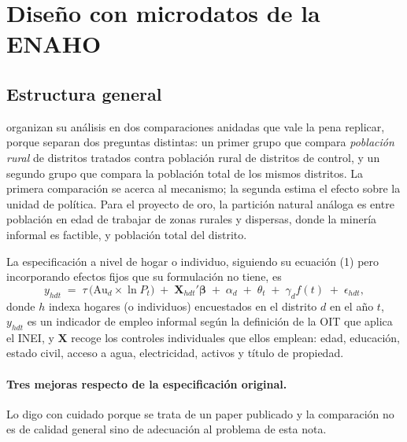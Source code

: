 \documentclass[11pt,a4paper]{article}
\newcommand{\Au}{\mathrm{Au}}
\begin{document}
\section{Diseño con microdatos de la ENAHO}\label{sec:enaho}

\subsection{Estructura general}

\citet{pecastaing2020} organizan su análisis en dos comparaciones anidadas que vale la pena replicar, porque separan dos preguntas distintas: un primer grupo que compara \emph{población rural} de distritos tratados contra población rural de distritos de control, y un segundo grupo que compara la población total de los mismos distritos. La primera comparación se acerca al mecanismo; la segunda estima el efecto sobre la unidad de política. Para el proyecto de oro, la partición natural análoga es entre población en edad de trabajar de zonas rurales y dispersas, donde la minería informal es factible, y población total del distrito.

La especificación a nivel de hogar o individuo, siguiendo su ecuación (1) pero incorporando efectos fijos que su formulación no tiene, es
\begin{equation}
y_{hdt} \;=\; \tau \,\bigl(\Au_d \times \ln P_t\bigr) \;+\; \mathbf{X}_{hdt}'\boldsymbol{\beta} \;+\; \alpha_d \;+\; \theta_t \;+\; \gamma_d f(t) \;+\; \epsilon_{hdt},
\label{eq:enaho}
\end{equation}
donde $h$ indexa hogares (o individuos) encuestados en el distrito $d$ en el año $t$, $y_{hdt}$ es un indicador de empleo informal según la definición de la OIT que aplica el INEI, y $\mathbf{X}$ recoge los controles individuales que ellos emplean: edad, educación, estado civil, acceso a agua, electricidad, activos y título de propiedad.

\paragraph{Tres mejoras respecto de la especificación original.} Lo digo con cuidado porque se trata de un paper publicado y la comparación no es de calidad general sino de adecuación al problema de esta nota.
\end{document}
